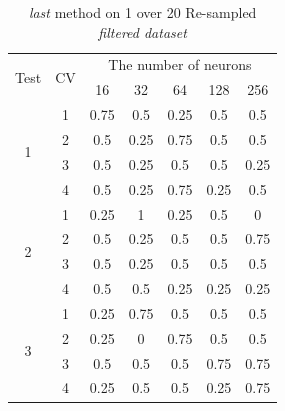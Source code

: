 \documentclass[draft,dvipsnames]{drexel-thesis}
\begin{document}
\begin{thesis}
\begin{table}[!t]
\centering
\caption{{\em last} method on 1 over 20 Re-sampled {\em filtered dataset}}
\label{tbl:last_1_20}
\begin{tabular}{|c|c|c|c|c|c|c|}
\hline
\multirow{2}{*}{Test} & \multirow{2}{*}{CV} & \multicolumn{5}{c|}{The number of neurons}                             \\ \cline{3-7}
                      &                     & 16           & 32           & 64          & 128         & 256          \\ \hline
\multirow{4}{*}{1}    & 1                   & 0.75         & 0.5          & 0.25        & 0.5         & 0.5          \\ \cline{2-7}
                      & 2                   & 0.5          & 0.25         & 0.75        & 0.5         & 0.5          \\ \cline{2-7}
                      & 3                   & 0.5          & 0.25         & 0.5         & 0.5         & 0.25         \\ \cline{2-7}
                      & 4                   & 0.5          & 0.25         & 0.75        & 0.25        & 0.5          \\ \hline
\multirow{4}{*}{2}    & 1                   & 0.25         & 1            & 0.25        & 0.5         & 0            \\ \cline{2-7}
                      & 2                   & 0.5          & 0.25         & 0.5         & 0.5         & 0.75         \\ \cline{2-7}
                      & 3                   & 0.5          & 0.25         & 0.5         & 0.5         & 0.5          \\ \cline{2-7}
                      & 4                   & 0.5          & 0.5          & 0.25        & 0.25        & 0.25         \\ \hline
\multirow{4}{*}{3}    & 1                   & 0.25         & 0.75         & 0.5         & 0.5         & 0.5          \\ \cline{2-7}
                      & 2                   & 0.25         & 0            & 0.75        & 0.5         & 0.5          \\ \cline{2-7}
                      & 3                   & 0.5          & 0.5          & 0.5         & 0.75        & 0.75         \\ \cline{2-7}
                      & 4                   & 0.25         & 0.5          & 0.5         & 0.25        & 0.75         \\ \hline

\end{tabular}
\end{table}
\end{thesis}
\end{document}
